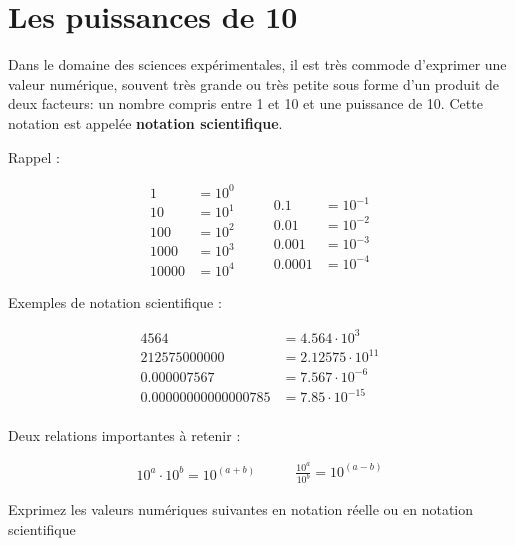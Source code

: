 \documentclass[
  11pt,
  a4paper,
  openany]{book}
\begin{document}
\section{Les puissances de 10}\label{les-puissances-de-10}

Dans le domaine des sciences expérimentales, il est très commode d'exprimer une valeur numérique, souvent très grande ou très petite sous forme d'un produit de deux facteurs: un nombre compris entre 1 et 10 et une puissance de 10. Cette notation est appelée \textbf{notation scientifique}.

Rappel :

\[ \begin{split}
    1 &= 10^0\\
    10 &= 10^1\\
    100 &= 10^2\\
    1000 &= 10^3\\
    10000 &= 10^4
\end{split}
\qquad
\begin{split}
    \\
    0.1 &= 10^{-1}\\
    0.01 &= 10^{-2}\\
    0.001 &= 10^{-3}\\
    0.0001 &= 10^{-4}
\end{split} \]

Exemples de notation scientifique :

\[ \begin{split}
    4564 &= 4.564\cdot10^3\\
    212575000000 &= 2.12575\cdot10^{11}\\
    0.000007567 &= 7.567\cdot10^{-6}\\
    0.00000000000000785 &= 7.85\cdot10^{-15}\\
\end{split} \]

\clearpage

Deux relations importantes à retenir :

\[ \begin{split}
    10^a \cdot 10^b = 10^{(a+b)}
\end{split}
\qquad
\begin{split}
    \frac{10^a}{10^b} = 10^{(a-b)}
\end{split} \]

\begin{Exercise}
Exprimez les valeurs numériques suivantes en notation réelle ou en notation scientifique

\end{Exercise}
\end{document}
